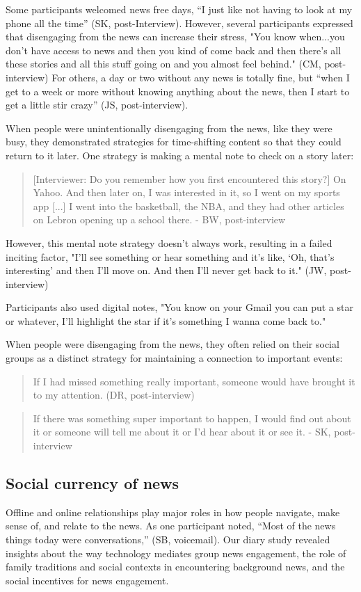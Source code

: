 \documentclass[sigchi]{acmart}
\begin{document}
Some participants welcomed news free days, “I just like not having to look at my phone all the time” (SK, post-Interview). However, several participants expressed that disengaging from the news can increase their stress, "You know when...you don't have access to news and then you kind of come back and then there's all these stories and all this stuff going on and you almost feel behind." (CM, post-interview) For others, a day or two without any news is totally fine, but “when I get to a week or more without knowing anything about the news, then I start to get a little stir crazy” (JS, post-interview).

When people were unintentionally disengaging from the news, like they were busy, they demonstrated strategies for time-shifting content so that they could return to it later. One strategy is making a mental note to check on a story later:
\begin{quote}
[Interviewer: Do you remember how you first encountered this story?] On Yahoo. And then later on, I was interested in it, so I went on my sports app [...] I went into the basketball, the NBA, and they had other articles on Lebron opening up a school there. - BW, post-interview
\end{quote}
However, this mental note strategy doesn't always work, resulting in a failed inciting factor, "I'll see something or hear something and it's like, ‘Oh, that's interesting’ and then I'll move on. And then I'll never get back to it." (JW, post-interview)

Participants also used digital notes, "You know on your Gmail you can put a star or whatever, I'll highlight the star if it's something I wanna come back to."

When people were disengaging from the news, they often relied on their social groups as a distinct strategy for maintaining a connection to important events:
\begin{quote}
If I had missed something really important, someone would have brought it to my attention. (DR, post-interview)
\end{quote}
\begin{quote}
If there was something super important to happen, I would find out about it or someone will tell me about it or I’d hear about it or see it. - SK, post-interview
\end{quote}

\subsection{Social currency of news}
Offline and online relationships play major roles in how people navigate, make sense of, and relate to the news. As one participant noted, “Most of the news things today were conversations,” (SB, voicemail). Our diary study revealed insights about the way technology mediates group news engagement, the role of family traditions and social contexts in encountering background news, and the social incentives for news engagement.
\end{document}
